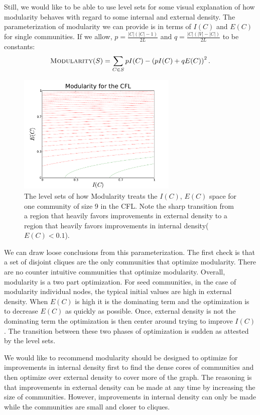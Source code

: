 \documentclass[conference]{IEEEtran}
\begin{document}
Still, we would like to be able to use level sets for some visual explanation of how modularity behaves with regard to some internal and external density.  The parameterization of modularity we can provide is in terms of $I(C)$ and $E(C)$ for single communities.  If we allow, $p=\frac{|C|(|C|-1)}{2L}$ and $q=\frac{|C|(|V|-|C|)}{2L}$ to be constants:
\begin{align}
 \text{\sc Modularity}(S) = \sum_{C \in S} p I(C) - \left(p I(C) + q E(C)\right)^2.
\end{align}
\begin{figure}[!h]
\centering
\includegraphics[width=3in]{Figures/cfl_mod_ls}
\caption{The level sets of how {\sc Modularity} treats the $I(C)$, $E(C)$ space for one community of size 9 in the CFL.  Note the sharp transition from a region that heavily favors improvements in external density to a region that heavily favors improvements in internal density($E(C) < 0.1$).}
\label{fig_f_cfl}
\end{figure}
We can draw loose conclusions from this parameterization.  The first check is that a set of disjoint cliques are the only communities that optimize modularity.  There are no counter intuitive communities that optimize modularity.  Overall, modularity is a two part optimization.  For seed communities, in the case of modularity individual nodes, the typical initial values are high in external density.  When $E(C)$ is high it is the dominating term and the optimization is to decrease $E(C)$ as quickly as possible.  Once, external density is not the dominating term the optimization is then center around trying to improve $I(C)$.  The transition between these two phases of optimization is sudden as attested by the level sets.

We would like to recommend modularity should be designed to optimize for improvements in internal density first to find the dense cores of communities and then optimize over external density to cover more of the graph.  The reasoning is that improvements in external density can be made at any time by increasing the size of communities.  However, improvements in internal density can only be made while the communities are small and closer to cliques.
\end{document}
